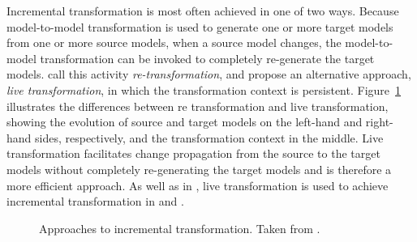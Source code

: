 Incremental transformation is most often achieved in one of two ways. Because model-to-model transformation is used to generate one or more target models from one or more source models, when a source model changes, the model-to-model transformation can be invoked to completely re-generate the target models. \cite{hearnden06incremental} call this activity \emph{re-transformation}, and propose an alternative approach, \emph{live transformation}, in which the transformation context is persistent. Figure~\ref{fig:incremental_transformation_types} illustrates the differences between re transformation and live transformation, showing the evolution of source and target models on the left-hand and right-hand sides, respectively, and the transformation context in the middle.  Live transformation facilitates change propagation from the source to the target models without completely re-generating the target models and is therefore a more efficient approach. As well as in \cite{hearnden06incremental}, live transformation is used to achieve incremental transformation in \cite{rath08live} and \cite{tratt08change}.

\begin{figure}[htbp]
	\centering
	\caption[Approaches to incremental transformation]{Approaches to incremental transformation. Taken from \cite{hearnden06incremental}.}
\label{fig:incremental_transformation_types}
\end{figure}

